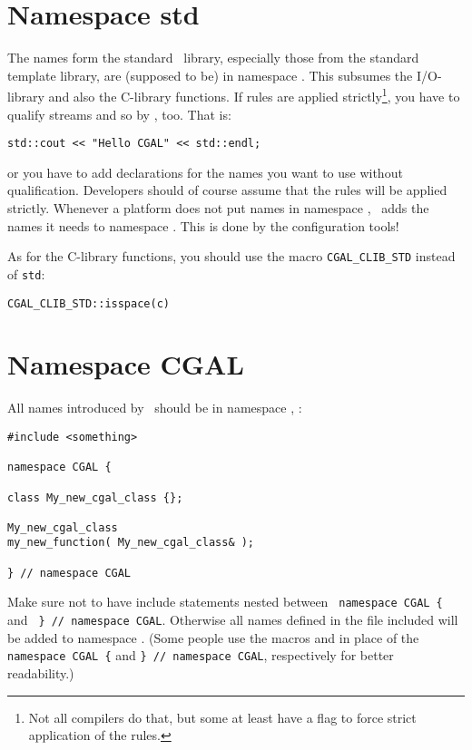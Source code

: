 \section{Namespace std}
The names form the standard \CC\ library, especially those from the standard
template library, are (supposed to be) in namespace . This subsumes
the I/O-library%
and also the C-library%
functions. 
If rules are applied strictly\footnote{Not all compilers do that, but some 
at least have a flag to force strict application of the rules.}, you have to
qualify streams and so by , too.  That is:
\begin{verbatim}
std::cout << "Hello CGAL" << std::endl;
\end{verbatim}
or you have to add  declarations for the names you want to use 
without  qualification. Developers should of course assume that 
the rules will be  applied strictly.  Whenever a platform does not put names 
in namespace , \cgal\ adds the names it needs to namespace . 
This is done by the configuration tools!

As for the C-library functions, you should use the macro 
\texttt{CGAL\_CLIB\_STD} instead of \texttt{std}:
\begin{verbatim}
CGAL_CLIB_STD::isspace(c)
\end{verbatim}

\section{Namespace CGAL}
All names introduced by \cgal\ should be in namespace , \eg: 
\begin{verbatim}
#include <something>

namespace CGAL {

class My_new_cgal_class {};

My_new_cgal_class 
my_new_function( My_new_cgal_class& );

} // namespace CGAL
\end{verbatim}
Make sure not to have include statements nested between 
\verb+ namespace CGAL { + and \verb+ } // namespace CGAL+.
Otherwise all names defined in the file included will be 
added to namespace .  (Some people use the macros
 and  
in place of the \texttt{namespace CGAL \{} and
\texttt{\} // namespace CGAL}, respectively for better readability.)


